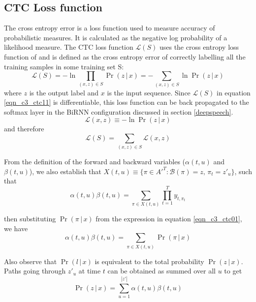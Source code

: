 \subsection{CTC Loss function}

The cross entropy error is a loss function used to measure accuracy of probabilistic measures.  It is calculated as the negative log probability of a likelihood measure.  The CTC loss function $\mathcal{L}(S)$ uses the cross entropy loss function of and is defined as the cross entropy error of correctly labelling all the training samples in some training set S:
\begin{equation}
\mathcal{L}(S) = - \ln \prod_{(x,z) \in S} \Pr(z \, | \, x) = - \sum_{(x,z) \in S} \ln \Pr(z \, | \, x)
\label{eqn_c3_ctc11}\end{equation}
where $z$ is the output label and $x$ is the input sequence.  Since $\mathcal{L}(S)$ in equation \ref{eqn_c3_ctc11} is differentiable, this loss function can be back propagated to the softmax layer in the BiRNN configuration discussed in section \ref{deepspeech}.
\begin{equation}
\mathcal{L}(x,z) \equiv - \ln \Pr(z \, | \, x)
\label{eqn_c3_ctc12}\end{equation}
and therefore 
\begin{equation}
\mathcal{L}(S) = \sum_{(x,z) \in S} \mathcal{L}(x,z)
\label{eqn_c3_ctc12}\end{equation}

From the definition of the forward and backward variables ($\alpha(t, u)$ and $\beta(t, u)$), we also establish that $X(t,u) \equiv \{ \pi \in A'^T : \mathcal{B}(\pi) = z, \, \pi_t = z'_u \}$, such that
\begin{equation}
\alpha(t, u) \beta(t, u) = \sum_{\pi \in X(t,u)} \prod_{t = 1}^{T} y_{t, \pi_t}\label{eqn_c3_ctc13}\end{equation}

then substituting $\Pr(\pi \, | \, x)$ from the expression in equation \ref{eqn_c3_ctc01}, we have
\begin{equation}
\alpha(t, u) \beta(t, u) = \sum_{\pi \in X(t,u)} \Pr(\pi \, | \, x)
\label{eqn_c3_ctc14}\end{equation}

Also observe that $\Pr(l \, | \, x)$ is equivalent to the total probability $\Pr(z \, | \, x)$. Paths going through $z'_u$ at time $t$ can be obtained as summed over all $u$ to get
\begin{equation}
\Pr(z \, | \, x) = \sum_{u = 1}^{|z'|} \alpha(t, u) \beta(t, u)
\label{eqn_c3_ctc15}\end{equation}

